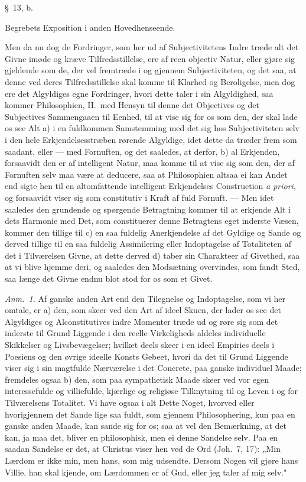 \documentclass[12pt,a4paper]{book}
\newcommand{\apage}[1]{\marginnote{\footnotesize\textit{[#1]}}}
\begin{document}
\begin{center}\large\S~13, b.\end{center}
\begin{center}Begrebets Exposition i anden Hovedhenseende.\end{center}

Men da nu dog de Fordringer, som her ud af Subjectivitetens Indre træde alt det
Givne imøde og kræve Tilfredsstillelse, ere af reen objectiv Natur, eller gjøre sig  \apage{48}
gjeldende som de, der vel fremtræde i og gjennem Subjectiviteten, og det saa, at
denne ved deres Tilfredsstillelse skal komme til Klarhed og Beroligelse, men dog ere
det Algyldiges egne Fordringer, hvori dette taler i sin Algyldighed, saa kommer
Philosophien, II.~med Hensyn til denne det Objectives og det Subjectives Sammengaaen
til Eenhed, til at vise sig for os som den, der skal lade os see Alt a) i en
fuldkommen Samstemming med det sig hos Subjectiviteten selv i den hele
Erkjendelsesstræben rørende Algyldige, idet dette da træder frem som saadant, eller
--- med Fornuften, og det saaledes, at derfor, b) al Erkjenden, forsaavidt den er af
intelligent Natur, maa komme til at vise sig som den, der af Fornuften selv maa være
at deducere, saa at Philosophien altsaa ei kan Andet end sigte hen til en
altomfattende intelligent Erkjendelses Construction \textit{a priori}, og forsaavidt
viser sig som constitutiv i Kraft af fuld Fornuft. --- Men idet saaledes den
grundende og spørgende Betragtning kommer til at erkjende Alt i dets Harmonie med
Det, som constituerer denne Betragtens eget inderste Væsen, kommer den tillige til
c) en saa fuldelig Anerkjendelse af det Gyldige og Sande og derved tillige til en
saa fuldelig Assimilering eller Indoptagelse af Totaliteten af det i Tilværelsen
Givne, at dette derved d) taber sin Charakteer af Givethed, saa at vi blive hjemme
deri, og saaledes den Modsætning overvindes, som fandt Sted, saa længe det Givne
endnu blot stod for os som et Givet.

{\small\emph{Anm.~1.} Af ganske anden Art end den Tilegnelse og Indoptagelse, som vi
her omtale, er a) den, som skeer ved den Art af ideel Skuen, der lader os see det
Algyldiges og Alconstitutives indre Momenter træde ud og røre sig som det inderste
til Grund Liggende i den reelle Virkeligheds aldeles individuelle Skikkelser og
Livsbevægelser; hvilket deels skeer i en ideel Empiries deels i Poesiens og den
øvrige ideelle Konsts Gebeet, hvori da det til Grund Liggende viser sig i sin
magtfulde Nærværelse i det Concrete, paa ganske individuel Maade; fremdeles ogsaa b)
den, som paa sympathetisk Maade skeer ved vor egen interessefulde og villiefulde,
kjærlige og religiøse Tilknytning til og Leven i og for Tilværelsens Totalitet. Vi
have ogsaa i alt Dette Noget, hvorved eller hvorigjennem det Sande lige saa fuldt,
som gjennem Philosophering, kun paa en ganske anden Maade, kan sande sig for os; saa
at vel den Bemærkning, at det kan, ja maa det, bliver en philosophisk, men ei denne
Sandelse selv. Paa en saadan Sandelse er det, at Christus viser hen ved de Ord
(Joh.\ 7, 17): „Min Lærdom er ikke min, men hans, som mig udsendte. Dersom Nogen vil
gjøre hans Villie, han skal kjende, om Lærdommen er af Gud, eller jeg taler af mig
selv."\par}
\end{document}
